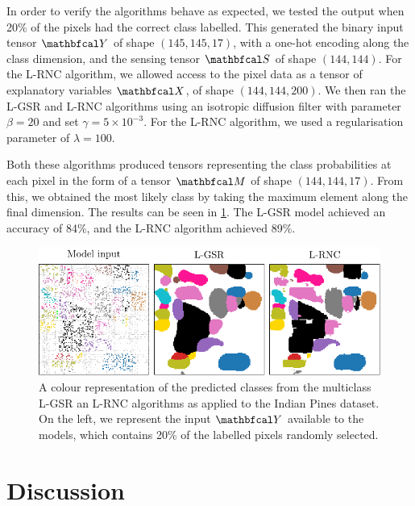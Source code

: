 In order to verify the algorithms behave as expected, we tested the output when 20\% of the pixels had the correct class labelled. This generated the binary input tensor $\Yt$ of shape $(145, 145, 17)$, with a one-hot encoding along the class dimension, and the sensing tensor $\St$ of shape $(144, 144)$. For the L-RNC algorithm, we allowed access to the pixel data as a tensor of explanatory variables $\Xt$, of shape $(144, 144, 200)$. We then ran the L-GSR and L-RNC algorithms using an isotropic diffusion filter with parameter $\beta = 20$ and set $\gamma = 5 \times 10^{-3}$. For the L-RNC algorithm, we used a regularisation parameter of $\lambda = 100$.  

Both these algorithms produced tensors representing the class probabilities at each pixel in the form of a tensor $\Mt$ of shape $(144, 144, 17)$. From this, we obtained the most likely class by taking the maximum element along the final dimension. The results can be seen in \cref{fig:pines}. The L-GSR model achieved an accuracy of 84\%, and the L-RNC algorithm achieved 89\%. 


\begin{figure}[t] 
    \begin{center}
        \includegraphics[width=\linewidth]{Figures/pines.pdf}
    \end{center}
    \caption[The predicted class labels from the multiclass L-GSR and L-RNC algorithms as applied to the Indian pines dataset]{A colour representation of the predicted classes from the multiclass L-GSR an L-RNC algorithms as applied to the Indian Pines dataset. On the left, we represent the input $\Yt$ available to the models, which contains 20\% of the labelled pixels randomly selected. }
    \label{fig:pines}
\end{figure}



\section{Discussion}

